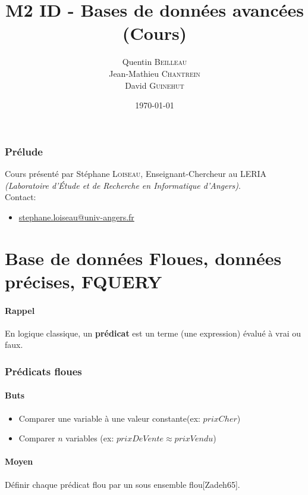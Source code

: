 \documentclass[a4paper,11pt]{article}
\title{M2 ID - Bases de données avancées \\ \normalsize (Cours)}
\author{Quentin \textsc{Beilleau} \\ Jean-Mathieu \textsc{Chantrein} \\ David \textsc{Guinehut}}
\date{\today}
\begin{document}
	\renewcommand{\headrulewidth}{0.001pt}
	
	\pagestyle{fancy}
	
	\maketitle

	\tableofcontents

\section*{Prélude}
Cours présenté par Stéphane \textsc{Loiseau}, Enseignant-Chercheur au LERIA \emph{(Laboratoire d’Étude et de Recherche en Informatique d'Angers)}.\\

Contact:
	\begin{itemize}
		\item[] \url{stephane.loiseau@univ-angers.fr} 
	\end{itemize}

\part{Base de données Floues, données précises, FQUERY}

\subsection*{Rappel}
En logique classique, un \textbf{prédicat} est un terme (une expression) évalué à vrai ou faux.

\section{Prédicats floues}

\subsection{Buts}
\begin{itemize}
\item Comparer une variable à une valeur constante(ex: $prixCher$)
\item Comparer $n$ variables (ex: $prixDeVente \approx prixVendu$)
\end{itemize}

\subsection{Moyen}
Définir chaque prédicat flou par un sous ensemble flou[Zadeh65].
\end{document}
